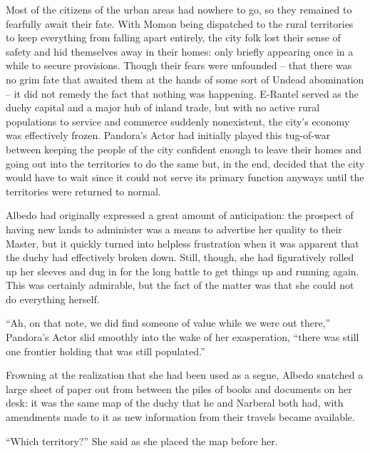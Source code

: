  

Most of the citizens of the urban areas had nowhere to go, so they remained to fearfully await their fate. With Momon being dispatched to the rural territories to keep everything from falling apart entirely, the city folk lost their sense of safety and hid themselves away in their homes: only briefly appearing once in a while to secure provisions. Though their fears were unfounded – that there was no grim fate that awaited them at the hands of some sort of Undead abomination – it did not remedy the fact that nothing was happening. E-Rantel served as the duchy capital and a major hub of inland trade, but with no active rural populations to service and commerce suddenly nonexistent, the city’s economy was effectively frozen. Pandora’s Actor had initially played this tug-of-war between keeping the people of the city confident enough to leave their homes and going out into the territories to do the same but, in the end, decided that the city would have to wait since it could not serve its primary function anyways until the territories were returned to normal.

 

Albedo had originally expressed a great amount of anticipation: the prospect of having new lands to administer was a means to advertise her quality to their Master, but it quickly turned into helpless frustration when it was apparent that the duchy had effectively broken down. Still, though, she had figuratively rolled up her sleeves and dug in for the long battle to get things up and running again. This was certainly admirable, but the fact of the matter was that she could not do everything herself.

 

“Ah, on that note, we did find someone of value while we were out there,” Pandora’s Actor slid smoothly into the wake of her exasperation, “there was still one frontier holding that was still populated.”

 

Frowning at the realization that she had been used as a segue, Albedo snatched a large sheet of paper out from between the piles of books and documents on her desk: it was the same map of the duchy that he and Narberal both had, with amendments made to it as new information from their travels became available.

 

“Which territory?” She said as she placed the map before her.

 

